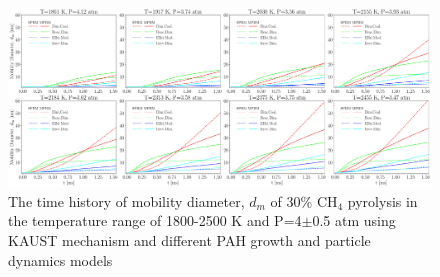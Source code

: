 \begin{figure}[H]
	\centering
	\includegraphics[width=1\textwidth]{Figures/Results/Shocktube/Stanford/june/stsh_cases_dm.pdf}
	\caption{The time history of mobility diameter, $d_m$ of 30\% $\mathrm{CH_4}$ pyrolysis in the temperature range of 1800-2500 K and P=4$\pm$0.5 atm using KAUST mechanism and different PAH growth and particle dynamics models}
	\label{fig:shocktubestcasedm} 
\end{figure}

